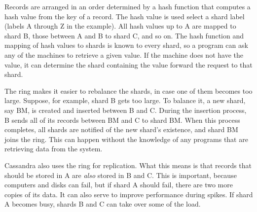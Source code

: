 Records are arranged in an order determined by a hash function
that computes a hash value from the key of a record.
The hash value is used select a shard label (labels A through Z in the example).
All hash values up to A are mapped to shard B,
those between A and B to shard C, and so on.
The hash function and mapping of hash values to shards is known to every shard,
so a program can ask any of the machines to retrieve a given value.
If the machine does not have the value, 
it can determine the shard containing the value
forward the request to that shard.

The ring makes it easier to rebalance the shards, 
in case one of them becomes too large.
Suppose, for example, shard B gets too large.
To balance it, a new shard, say BM, is created and inserted between B and C.
During the insertion process, B sends all of its records between BM and C to shard BM.
When this process completes, all shards are notified of the new
shard's existence, and shard BM joins the ring.
This can happen without the knowledge of any programs 
that are retrieving data from the system.

Cassandra also uses the ring for replication.
What this means is that records that should be stored in A 
are \emph{also} stored in B and C.
This is important, because computers and disks can fail,
but if shard A should fail, there are two more copies of its data.
It can also serve to improve performance during spikes.
If shard A becomes busy, shards B and C can take over some of the load.

